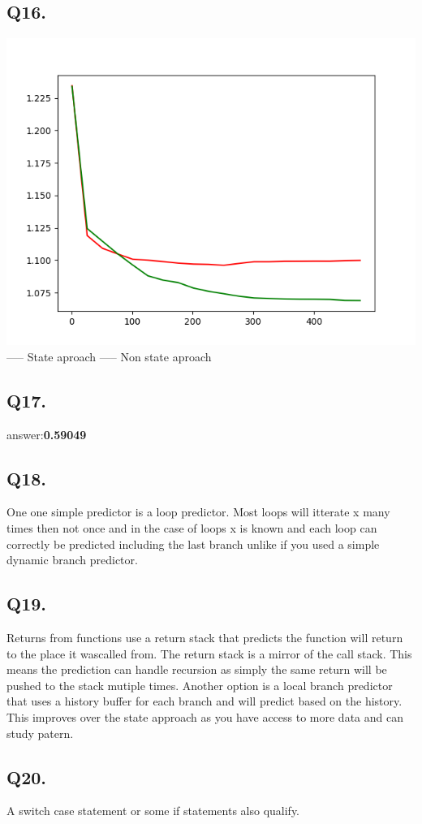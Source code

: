\documentclass[a4]{article}
\begin{document}
\subsection*{Q16.}
\includegraphics{phase3graph.png}
\color{green} -----\color{black} State aproach\newline
\color{red} -----\color{black} Non state aproach 

\subsection*{Q17.}
answer:\textbf{0.59049}\newline

\subsection*{Q18.}
One one simple predictor is a loop predictor. Most loops will itterate x many times then not once and in the case of loops x is known and each loop can correctly be 
predicted including the last branch unlike if you used a simple dynamic branch predictor.

\subsection*{Q19.}
Returns from functions use a return stack that predicts the function will return to the place it wascalled from. The return stack is a mirror of the call stack.
This means the prediction can handle recursion as simply the same return will be pushed to the stack mutiple times. Another option is a local branch predictor 
that uses a history buffer for each branch and will predict based on the history. This improves over the state approach as you have access to more data and can study patern.

\subsection*{Q20.}
A switch case statement or some if statements also qualify. 

\end{document}
